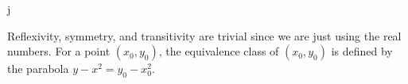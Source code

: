 \documentclass[../../main.tex]{subfiles}
\begin{document}
\begin{problem}[\S3 Ex. 1]
  j
\end{problem}

Reflexivity, symmetry, and transitivity are trivial since we are just using the real numbers.
For a point $(x_0, y_0)$, the equivalence class of $(x_0, y_0)$ is defined by the parabola $y - x^2 = y_0 - x_0^2$.
\end{document}
